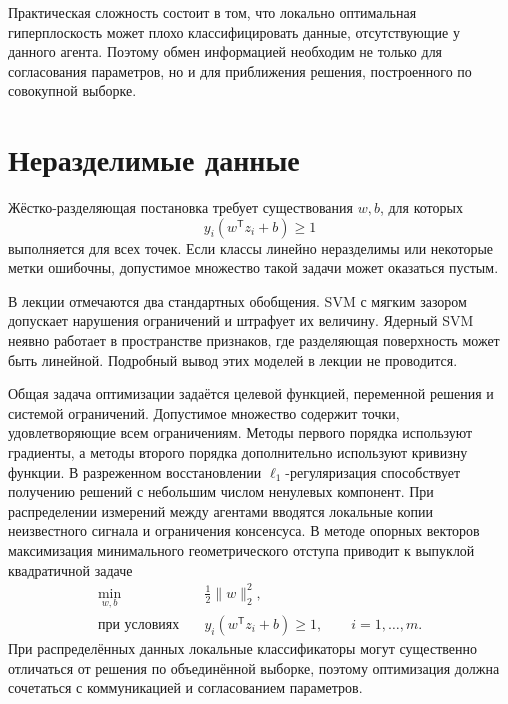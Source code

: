 Практическая сложность состоит в том, что локально оптимальная
гиперплоскость может плохо классифицировать данные, отсутствующие у
данного агента. Поэтому обмен информацией необходим не только для
согласования параметров, но и для приближения решения, построенного
по совокупной выборке.

\section{Неразделимые данные}

Жёстко-разделяющая постановка требует существования \(w,b\), для
которых
\[
    y_i(w^{\mathsf T}z_i+b)\ge1
\]
выполняется для всех точек. Если классы линейно неразделимы или
некоторые метки ошибочны, допустимое множество такой задачи может
оказаться пустым.

В лекции отмечаются два стандартных обобщения. SVM с мягким зазором
допускает нарушения ограничений и штрафует их величину. Ядерный SVM
неявно работает в пространстве признаков, где разделяющая поверхность
может быть линейной. Подробный вывод этих моделей в лекции не
проводится.


Общая задача оптимизации задаётся целевой функцией, переменной решения
и системой ограничений. Допустимое множество содержит точки,
удовлетворяющие всем ограничениям. Методы первого порядка используют
градиенты, а методы второго порядка дополнительно используют
кривизну функции. В разреженном восстановлении \(\ell_1\)-регуляризация
способствует получению решений с небольшим числом ненулевых компонент. При
распределении измерений между агентами вводятся локальные копии
неизвестного сигнала и ограничения консенсуса. В методе опорных
векторов максимизация минимального геометрического отступа приводит
к выпуклой квадратичной задаче
\[
    \begin{aligned}
        \min_{w,b}\quad&\frac12\lVert w\rVert_2^2,\\
        \text{при условиях}\quad&
        y_i(w^{\mathsf T}z_i+b)\ge1,
        \qquad i=1,\ldots,m.
    \end{aligned}
\]
При распределённых данных локальные классификаторы могут существенно
отличаться от решения по объединённой выборке, поэтому оптимизация
должна сочетаться с коммуникацией и согласованием параметров.
